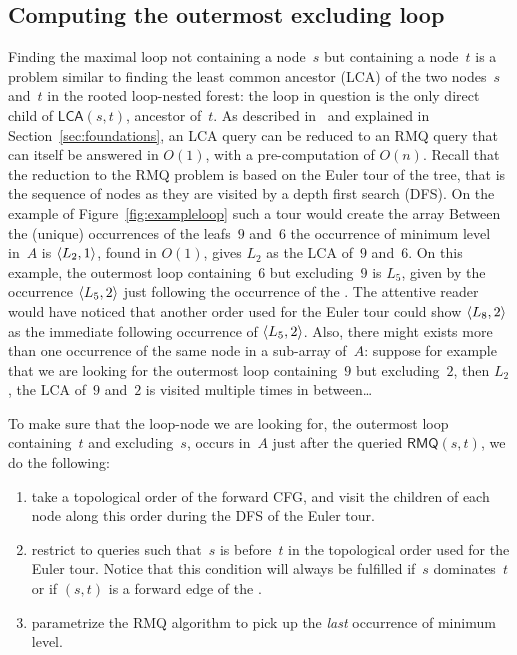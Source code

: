 \subsection{Computing the outermost excluding loop}
\label{sec:ole}
Finding the maximal loop not containing a node~$s$ but containing a node~$t$ is a problem similar to finding the least common ancestor (LCA) of the two nodes~$s$ and~$t$ in the rooted loop-nested forest:
the loop in question is the only direct child of $\textsf{LCA}(s,t)$, ancestor of~$t$.
As described in~\cite{BenderFC00} and explained in Section~\ref{sec:foundations}, an LCA query can be reduced to an RMQ query that can itself be answered in $O(1)$, with a pre-computation of $O(n)$.
Recall that the reduction to the RMQ problem is based on the Euler tour of the tree, that is the sequence of nodes as they are visited by a depth first search (DFS).
On the example of Figure~\ref{fig:exampleloop} such a tour would create the array%
Between the (unique) occurrences of the leafs~$9$ and~$6$ the occurrence of minimum level in~$A$ is $\langle L_2,1\rangle$, found in $O(1)$, gives $L_2$ as the LCA of~$9$ and~$6$.
On this example, the outermost loop containing~$6$ but excluding~$9$ is $L_5$, given by the occurrence $\langle L_5,2\rangle$ just following the occurrence of the \@LCA.
The attentive reader would have noticed that another order used for the Euler tour could show $\langle L_8,2\rangle$ as the immediate following occurrence of $\langle L_5,2\rangle$.
Also, there might exists more than one occurrence of the same node in a sub-array of~$A$:
suppose for example that we are looking for the outermost loop containing~$9$ but excluding~$2$, then $L_2$, the LCA of~$9$ and~$2$ is visited multiple times in between\ldots

To make sure that the loop-node we are looking for, \ie the outermost loop containing~$t$ and excluding~$s$, occurs in~$A$ just after the queried $\textsf{RMQ}(s,t)$, we do the following:
\begin{enumerate}
\item
	take a topological order of the forward CFG, and visit the children of each node along this order during the DFS of the Euler tour.
\item
	restrict to queries such that~$s$ is before~$t$ in the topological order used for the Euler tour.
	Notice that this condition will always be fulfilled if~$s$ dominates~$t$ or if $(s,t)$ is a forward edge of the \@CFG.
\item
	parametrize the RMQ algorithm to pick up the \emph{last} occurrence of minimum level.
\end{enumerate}

